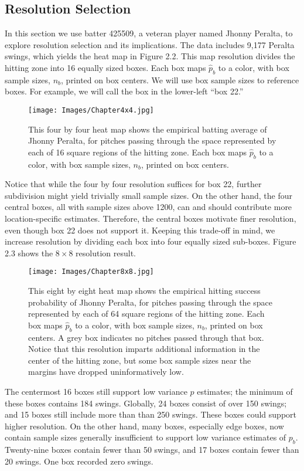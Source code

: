 \subsection{Resolution Selection}

In this section we use batter 425509, a veteran player named Jhonny Peralta, to explore resolution selection and its implications. The data includes 9,177 Peralta swings, which yields the heat map in Figure 2.2. This map resolution divides the hitting zone into 16 equally sized boxes. Each box maps $\hat{p}_{b}$ to a color, with box sample sizes, $n_{b}$, printed on box centers. We will use box sample sizes to reference boxes. For example, we will call the box in the lower-left ``box 22.'' 
        \begin{figure}[H]
      	\centering
      	\texttt{[image: Images/Chapter4x4.jpg]} 
      	\caption{This four by four heat map shows the empirical batting average of Jhonny Peralta, for pitches passing through the space represented by each of 16 square regions of the hitting zone. Each box maps $\hat{p}_{b}$ to a color, with box sample sizes, $n_{b}$, printed on box centers.}
      	\end{figure} 

Notice that while the four by four resolution suffices for box 22, further subdivision might yield trivially small sample sizes. On the other hand, the four central boxes, all with sample sizes above 1200, can and should contribute more location-specific estimates. Therefore, the central boxes motivate finer resolution, even though box 22 does not support it. Keeping this trade-off in mind, we increase resolution by dividing each box into four equally sized sub-boxes. Figure 2.3 shows the $8 \times 8$ resolution result.
        \begin{figure}[H]
      	\centering
      	\texttt{[image: Images/Chapter8x8.jpg]} 
      	\caption{This eight by eight heat map shows the empirical hitting success probability of Jhonny Peralta, for pitches passing through the space represented by each of 64 square regions of the hitting zone. Each box maps $\hat{p}_{b}$ to a color, with box sample sizes, $n_{b}$, printed on box centers. A grey box indicates no pitches passed through that box. Notice that this resolution imparts additional information in the center of the hitting zone, but some box sample sizes near the margins have dropped uninformatively low.}
      	\end{figure} 
The centermost 16 boxes still support low variance $p$ estimates; the minimum of these boxes contains 184 swings. Globally, 24 boxes consist of over 150 swings; and 15 boxes still include more than than 250 swings. These boxes could support higher resolution. On the other hand, many boxes, especially edge boxes, now contain sample sizes generally insufficient to support low variance estimates of $p_{b}$. Twenty-nine boxes contain fewer than 50 swings, and 17 boxes contain fewer than 20 swings. One box recorded zero swings.

